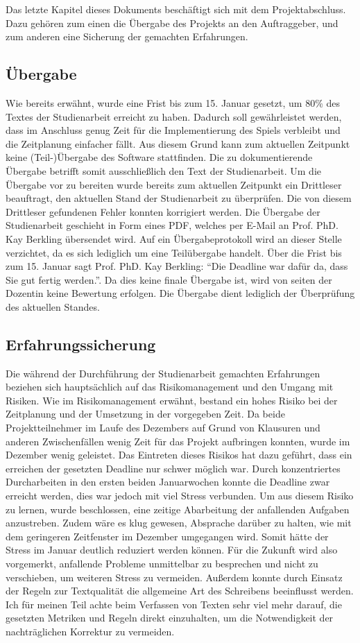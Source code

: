 Das letzte Kapitel dieses Dokuments beschäftigt sich mit dem Projektabschluss. Dazu gehören zum einen die Übergabe des Projekts an den Auftraggeber, und zum anderen eine Sicherung der gemachten Erfahrungen.

\subsection{Übergabe}
Wie bereits erwähnt, wurde eine Frist bis zum 15. Januar gesetzt, um 80\% des Textes der Studienarbeit erreicht zu haben. Dadurch soll gewährleistet werden, dass im Anschluss genug Zeit für die Implementierung des Spiels verbleibt und die Zeitplanung einfacher fällt.
Aus diesem Grund kann zum aktuellen Zeitpunkt keine (Teil-)Übergabe des Software stattfinden. Die zu dokumentierende Übergabe betrifft somit ausschließlich den Text der Studienarbeit.
Um die Übergabe vor zu bereiten wurde bereits zum aktuellen Zeitpunkt ein Drittleser beauftragt, den aktuellen Stand der Studienarbeit zu überprüfen. Die von diesem Drittleser gefundenen Fehler konnten korrigiert werden.
Die Übergabe der Studienarbeit geschieht in Form eines PDF, welches per E-Mail an Prof. PhD. Kay Berkling übersendet wird. Auf ein Übergabeprotokoll wird an dieser Stelle verzichtet, da es sich lediglich um eine Teilübergabe handelt.
Über die Frist bis zum 15. Januar sagt Prof. PhD. Kay Berkling: \enquote{Die Deadline war dafür da, dass Sie gut fertig werden.}. Da dies keine finale Übergabe ist, wird von seiten der Dozentin keine Bewertung erfolgen. Die Übergabe dient lediglich der Überprüfung des aktuellen Standes.

\subsection{Erfahrungssicherung}
Die während der Durchführung der Studienarbeit gemachten Erfahrungen beziehen sich hauptsächlich auf das Risikomanagement und den Umgang mit Risiken.
Wie im Risikomanagement erwähnt, bestand ein hohes Risiko bei der Zeitplanung und der Umsetzung in der vorgegeben Zeit. Da beide Projektteilnehmer im Laufe des Dezembers auf Grund von Klausuren und anderen Zwischenfällen wenig Zeit für das Projekt aufbringen konnten, wurde im Dezember wenig geleistet.
Das Eintreten dieses Risikos hat dazu geführt, dass ein erreichen der gesetzten Deadline nur schwer möglich war. Durch konzentriertes Durcharbeiten in den ersten beiden Januarwochen konnte die Deadline zwar erreicht werden, dies war jedoch mit viel Stress verbunden.
Um aus diesem Risiko zu lernen, wurde beschlossen, eine zeitige Abarbeitung der anfallenden Aufgaben anzustreben. Zudem wäre es klug gewesen, Absprache darüber zu halten, wie mit dem geringeren Zeitfenster im Dezember umgegangen wird.
Somit hätte der Stress im Januar deutlich reduziert werden können. Für die Zukunft wird also vorgemerkt, anfallende Probleme unmittelbar zu besprechen und nicht zu verschieben, um weiteren Stress zu vermeiden.
Außerdem konnte durch Einsatz der Regeln zur Textqualität die allgemeine Art des Schreibens beeinflusst werden. Ich für meinen Teil achte beim Verfassen von Texten sehr viel mehr darauf, die gesetzten Metriken und Regeln direkt einzuhalten, um die Notwendigkeit der nachträglichen Korrektur zu vermeiden.
